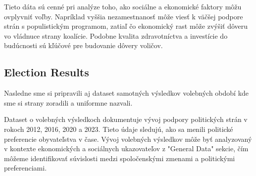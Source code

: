 \documentclass[main.tex]{subfiles}
\begin{document}
Tieto dáta sú cenné pri analýze toho, ako sociálne a ekonomické faktory môžu ovplyvniť voľby. Napríklad vyššia nezamestnanosť môže viesť k väčšej podpore strán s populistickým programom, zatiaľ čo ekonomický rast môže zvýšiť dôveru vo vládnuce strany koalície. 
Podobne kvalita zdravotníctva a investície do budúcnosti sú kľúčové pre budovanie dôvery voličov.


\subsection{Election Results}

Nasledne sme si pripravili aj dataset samotných výsledkov volebných období kde sme si strany zoradili a uniformne nazvali.

Dataset o volebných výsledkoch dokumentuje vývoj podpory politických strán v rokoch 2012, 2016, 2020 a 2023. 
Tieto údaje sledujú, ako sa menili politické preferencie obyvateľstva v čase.
Vývoj volebných výsledkov môže byť analyzovaný v kontexte ekonomických a sociálnych ukazovateľov z "General Data" sekcie, čím môžeme identifikovať súvislosti medzi spoločenskými zmenami a politickými preferenciami.
\end{document}
